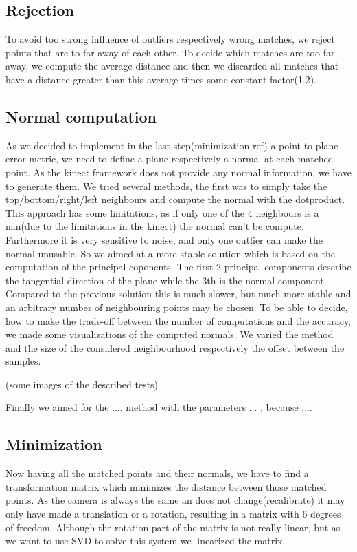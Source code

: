 \documentclass[twocolumn]{article}
\begin{document}
\subsection{Rejection}
To avoid too strong influence of outliers respectively wrong matches, we reject points that are to far away of each other. 
To decide which matches are too far away, we compute the average distance and then we discarded all matches that have a distance greater than this average times some constant factor(1.2).

\subsection{Normal computation}
As we decided to implement in the last step(minimization ref) a point to plane error metric, we need to define a plane respectively a normal at each matched point.
As the kinect framework does not provide any normal information, we have to generate them. We tried several methods, the first was to simply take the top/bottom/right/left neighbours and compute the normal with the dotproduct.
This approach has some limitations, as if only one of the 4 neighbours is a nan(due to the limitations in the kinect) the normal can't be compute. Furthermore it is very sensitive to noise, and only one outlier can make the normal unusable.
So we aimed at a more stable solution which is based on the computation of the principal coponents. 
The first 2 principal components describe the tangential direction of the plane while the 3th is the normal component.
Compared to the previous solution this is much slower, but much more stable and an arbitrary number of neighbouring points may be chosen.
To be able to decide, how to make the trade-off between the number of computations and the accuracy, we made some visualizations of the computed normals.
We varied the method and the size of the considered neighbourhood respectively the offset between the samples.

(some images of the described tests)

Finally we aimed for the .... method with the parameters ... , because ....

\subsection{Minimization}
Now having all the matched points and their normals, we have to find a transformation matrix which minimizes the distance between those matched points.
As the camera is always the same an does not change(recalibrate) it may only have made a translation or a rotation, resulting in a matrix with 6 degrees of freedom.
Although the rotation part of the matrix is not really linear, but as we want to use SVD to solve this system we linearized the matrix
\end{document}
